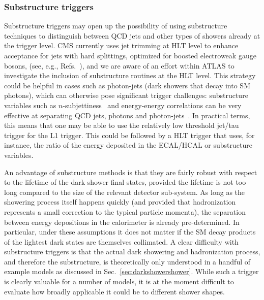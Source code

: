 \subsubsection{Substructure triggers}
Substructure triggers may open up the possibility of using substructure techniques to distinguish between QCD jets and other types of showers already at the trigger level.
CMS currently uses jet trimming at HLT level to enhance acceptance for jets with hard splittings, optimized for boosted electroweak gauge bosons, (see, e.g., Refs.~\cite{Sirunyan:2017wto,Sirunyan:2017acf}), and we are aware of an effort within ATLAS to investigate the inclusion of substructure routines at the HLT level. This strategy could be helpful in cases such as photon-jets (dark showers that decay into SM photons), which can otherwise pose significant trigger challenges: substructure variables such as $n$-subjettiness~\cite{Thaler:2010tr} and energy-energy correlations can be very effective at separating QCD jets, photons and photon-jets~\cite{Ellis:2012sd,Ellis:2012zp}. In practical terms, this means that one may be able to use the relatively low threshold jet/tau trigger for the L1 trigger. This could be followed by a HLT trigger that uses, for instance, the ratio of the energy deposited in the ECAL/HCAL or substructure variables.

An advantage of  substructure methods is that they are fairly robust with respect to the lifetime of the dark shower final states, provided the lifetime is not too long compared to the size of the relevant detector sub-system. As long as the showering process itself happens quickly (and provided that hadronization represents a small correction to the typical particle momenta), %
the separation between energy depositions in the calorimeter is already pre-determined. In particular, under these assumptions it does not matter if the SM decay products of the lightest dark states are themselves collimated. %
A clear difficulty with substructure triggers is that the actual dark showering and hadronization process, and therefore the substructure, is theoretically only understood in a handful of example models as discussed in Sec.~\ref{sec:darkshowershower}. While such a trigger is clearly valuable for a number of models, it is at the moment difficult to evaluate how broadly applicable it could be to different shower shapes.

